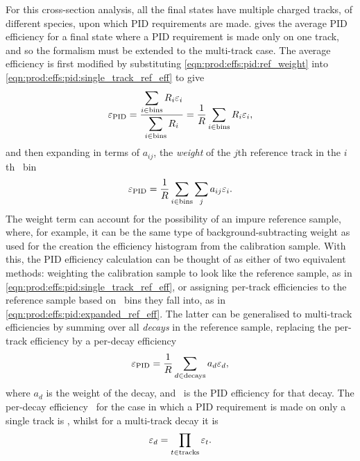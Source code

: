 For this cross-section analysis, all the final states have multiple charged 
tracks, of different species, upon which \ac{PID} requirements are made.
 gives the average \ac{PID} 
efficiency for a final state where a \ac{PID} requirement is made only on one 
track, and so the formalism must be extended to the multi-track case.
The average efficiency is first modified by substituting 
\cref{eqn:prod:effs:pid:ref_weight} into 
\cref{eqn:prod:effs:pid:single_track_ref_eff} to give
\begin{equation}
  \effpid = \frac{%
    \displaystyle\sum_{i \in \textnormal{bins}} R_{i}\eff_{i}
  }{%
    \displaystyle\sum_{i \in \textnormal{bins}} R_{i}
  }
  = \frac{1}{R}\sum_{i \in \textnormal{bins}} R_{i}\eff_{i},
\end{equation}
and then expanding in terms of $a_{ij}$, the \emph{weight} of the $j$th 
reference track in the $i$th \ptotetanspd\ bin
\begin{equation}
  \varepsilon_{\textnormal{PID}} = \frac{1}{R}
            \sum_{i \in \textnormal{bins}}\sum_{j} a_{ij}\varepsilon_{i}.
  \label{eqn:prod:effs:pid:expanded_ref_eff}
\end{equation}
The weight term can account for the possibility of an impure reference sample, 
where, for example, it can be the same type of background-subtracting weight as 
used for the creation the efficiency histogram from the calibration sample.
With this, the \ac{PID} efficiency calculation can be thought of as either of 
two equivalent methods: weighting the calibration sample to look like the 
reference sample, as in \cref{eqn:prod:effs:pid:single_track_ref_eff}, or 
assigning per-track efficiencies to the reference sample based on \ptotetanspd\ 
bins they fall into, as in \cref{eqn:prod:effs:pid:expanded_ref_eff}.
The latter can be generalised to multi-track efficiencies by summing over all 
\emph{decays} in the reference sample, replacing the per-track efficiency by a 
per-decay efficiency \effpiddecay
\begin{equation}
  \varepsilon_{\textnormal{PID}} = \frac{1}{R}\sum_{d\in\text{decays}} a_{d}\varepsilon_{d},
\end{equation}
where $a_{d}$ is the weight of the decay, and \effpiddecay\ is the \ac{PID} 
efficiency for that decay.
The per-decay efficiency \effpiddecay\ for the case in which a \ac{PID} 
requirement is made on only a single track is \effpidtrack, whilst for a 
multi-track decay it is
\begin{equation}
  \varepsilon_{d} = \prod_{t \in \textnormal{tracks}} \varepsilon_{t}.
\end{equation}

